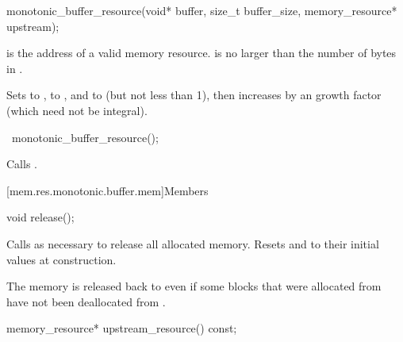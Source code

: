 %
\begin{itemdecl}
monotonic_buffer_resource(void* buffer, size_t buffer_size, memory_resource* upstream);
\end{itemdecl}

\begin{itemdescr}
\pnum
\expects
{} is the address of a valid memory resource.
 is no larger than the number of bytes in .

\pnum
\effects
Sets  to ,
 to , and
 to  (but not less than 1),
then increases 
by an  growth factor (which need not be integral).
\end{itemdescr}

%
\begin{itemdecl}
~monotonic_buffer_resource();
\end{itemdecl}

\begin{itemdescr}
\pnum
\effects
Calls .
\end{itemdescr}


[mem.res.monotonic.buffer.mem]{Members}

%
\begin{itemdecl}
void release();
\end{itemdecl}

\begin{itemdescr}
\pnum
\effects
Calls  as necessary
to release all allocated memory.
Resets  and 
to their initial values at construction.

\pnum
\begin{note}
The memory is released back to 
even if some blocks that were allocated from 
have not been deallocated from .
\end{note}
\end{itemdescr}

%
\begin{itemdecl}
memory_resource* upstream_resource() const;
\end{itemdecl}

